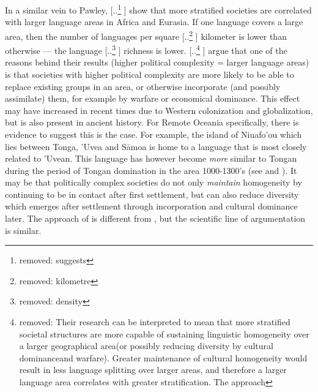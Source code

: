 \documentclass[unnumsec,webpdf,modern,medium]{oup-authoring-template}
\providecommand{\DIFaddtex}[1]{{\protect\color{blue} \sf #1}} %
\providecommand{\DIFdeltex}[1]{{\protect\color{red} [..\footnote{removed: #1} ]}} %
\providecommand{\DIFaddbegin}{} %
\providecommand{\DIFaddend}{} %
\providecommand{\DIFdelbegin}{} %
\providecommand{\DIFdelend}{} %
\providecommand{\DIFadd}[1]{\texorpdfstring{\DIFaddtex{#1}}{#1}} %
\providecommand{\DIFdel}[1]{\texorpdfstring{\DIFdeltex{#1}}{}} %
\newcommand{\DIFscaledelfig}{0.5}
\newlength{\DIFdelgraphicswidth} %
\newlength{\DIFdelgraphicsheight} %
\newcommand{\DIFaddincludegraphics}[2][]{{\color{blue}\fbox{\DIFOincludegraphics[#1]{#2}}}} %
\newcommand{\DIFdelincludegraphics}[2][]{%
\sbox{\DIFdelgraphicsbox}{\DIFOincludegraphics[#1]{#2}}%
\settoboxwidth{\DIFdelgraphicswidth}{\DIFdelgraphicsbox} %
\settoboxtotalheight{\DIFdelgraphicsheight}{\DIFdelgraphicsbox} %
\scalebox{\DIFscaledelfig}{%
\parbox[b]{\DIFdelgraphicswidth}{\usebox{\DIFdelgraphicsbox}\\[-\baselineskip] \rule{\DIFdelgraphicswidth}{0em}}\llap{\resizebox{\DIFdelgraphicswidth}{\DIFdelgraphicsheight}{%
\setlength{\unitlength}{\DIFdelgraphicswidth}%
\begin{picture}(1,1)%
\thicklines\linethickness{2pt} %
{\color[rgb]{1,0,0}\put(0,0){\framebox(1,1){}}}%
{\color[rgb]{1,0,0}\put(0,0){\line( 1,1){1}}}%
{\color[rgb]{1,0,0}\put(0,1){\line(1,-1){1}}}%
\end{picture}%
}\hspace*{3pt}}} %
} %
\DeclareRobustCommand{\DIFaddbegin}{\DIFOaddbegin \let\includegraphics\DIFaddincludegraphics} %
\DeclareRobustCommand{\DIFaddend}{\DIFOaddend \let\includegraphics\DIFOincludegraphics} %
\DeclareRobustCommand{\DIFdelbegin}{\DIFOdelbegin \let\includegraphics\DIFdelincludegraphics} %
\DeclareRobustCommand{\DIFdelend}{\DIFOaddend \let\includegraphics\DIFOincludegraphics} %
\begin{document}
In a similar vein to Pawley, \citet{curriemace2009} \DIFdelbegin \DIFdel{suggests }\DIFdelend \DIFaddbegin \DIFadd{show }\DIFaddend that more stratified societies are correlated with larger language areas in Africa and Eurasia. If one language covers a large area, then the number of languages per square \DIFdelbegin \DIFdel{kilometre }\DIFdelend \DIFaddbegin \DIFadd{kilometer }\DIFaddend is lower than otherwise --- the language \DIFdelbegin \DIFdel{density }\DIFdelend \DIFaddbegin \DIFadd{richness }\DIFaddend is lower. \DIFdelbegin \DIFdel{Their research can be interpreted to mean that more stratified societal structures are more capable of sustaining linguistic homogeneity over a larger geographical area(or possibly reducing diversity by cultural dominanceand warfare). Greater maintenance of cultural homogeneity would result in less language splitting over larger areas, and therefore a larger language area correlates with greater stratification. The approach }\DIFdelend \DIFaddbegin \DIFadd{\citet{curriemace2009} argue that one of the reasons behind their results (higher political complexity = larger language areas) is that societies with higher political complexity are more likely to be able to replace existing groups in an area, or otherwise incorporate (and possibly assimilate) them, for example by warfare or economical dominance. This effect may have increased in recent times due to Western colonization and globalization, but is also present in ancient history. For Remote Oceania specifically, there is evidence to suggest this is the case. For example, the island of Niuafo'ou which lies between Tonga, 'Uvea and S\={a}moa is home to a language that is most closely related to 'Uvean. This language has however become \emph{more} similar to Tongan during the period of Tongan domination in the area 1000-1300's (see \citet{aswani1998tongan} and \citep[2-9]{tuskamoto_niuafoou}). It may be that politically complex societies do not only \emph{maintain} homogeneity by continuing to be in contact after first settlement, but can also reduce diversity which emerges after settlement through incorporation and cultural dominance later. The approach of \citet{curriemace2009} }\DIFaddend is different from \citet{pawley81, pawley2007}, but the scientific line of argumentation is similar.
\end{document}
